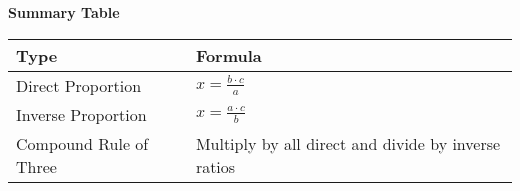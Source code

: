 \textbf{Summary Table}

\begin{center}
    \begin{tabular}{|l|l|}
    \hline
    \textbf{Type} & \textbf{Formula} \\
    \hline
    Direct Proportion & \(x = \frac{b \cdot c}{a}\) \\
    Inverse Proportion & \(x = \frac{a \cdot c}{b}\) \\
    Compound Rule of Three & Multiply by all direct and divide by inverse ratios \\
    \hline
    \end{tabular}
\end{center}


